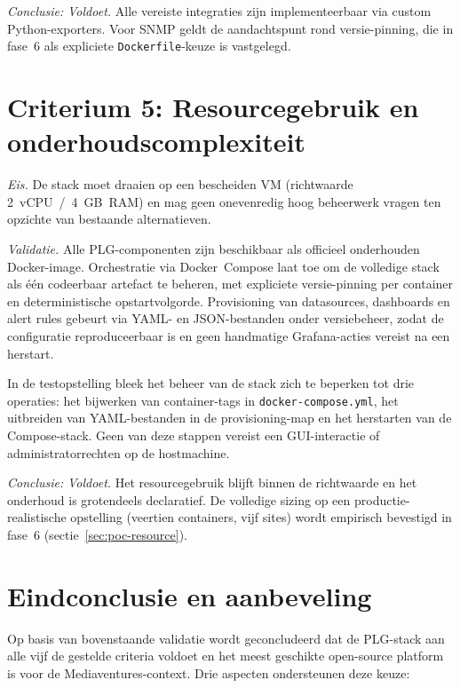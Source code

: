 \emph{Conclusie:} \emph{Voldoet.} Alle vereiste integraties zijn implementeerbaar via custom Python-exporters. Voor SNMP geldt de aandachtspunt rond versie-pinning, die in fase~6 als expliciete \texttt{Dockerfile}-keuze is vastgelegd.

\section*{Criterium 5: Resourcegebruik en onderhoudscomplexiteit}

\emph{Eis.} De stack moet draaien op een bescheiden VM (richtwaarde 2~vCPU~/~4~GB~RAM) en mag geen onevenredig hoog beheerwerk vragen ten opzichte van bestaande alternatieven.

\emph{Validatie.} Alle PLG-componenten zijn beschikbaar als officieel onderhouden Docker-image. Orchestratie via Docker~Compose laat toe om de volledige stack als één codeerbaar artefact te beheren, met expliciete versie-pinning per container en deterministische opstartvolgorde. Provisioning van datasources, dashboards en alert rules gebeurt via YAML- en JSON-bestanden onder versiebeheer, zodat de configuratie reproduceerbaar is en geen handmatige Grafana-acties vereist na een herstart.

In de testopstelling bleek het beheer van de stack zich te beperken tot drie operaties: het bijwerken van container-tags in \texttt{docker-compose.yml}, het uitbreiden van YAML-bestanden in de provisioning-map en het herstarten van de Compose-stack. Geen van deze stappen vereist een GUI-interactie of administratorrechten op de hostmachine.

\emph{Conclusie:} \emph{Voldoet.} Het resourcegebruik blijft binnen de richtwaarde en het onderhoud is grotendeels declaratief. De volledige sizing op een productie-realistische opstelling (veertien containers, vijf sites) wordt empirisch bevestigd in fase~6 (sectie~\ref{sec:poc-resource}).

\section*{Eindconclusie en aanbeveling}

Op basis van bovenstaande validatie wordt geconcludeerd dat de PLG-stack aan alle vijf de gestelde criteria voldoet en het meest geschikte open-source platform is voor de Mediaventures-context. Drie aspecten ondersteunen deze keuze:

